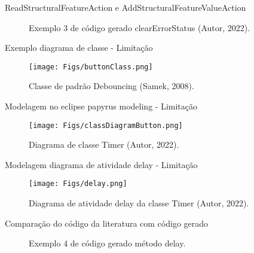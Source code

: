 \documentclass[handout,aspectratio = 169]{beamer}
\begin{document}
\begin{frame}{ReadStructuralFeatureAction e AddStructuralFeatureValueAction}

\begin{figure}[htbp]
\centering
{} %
\quad %
\caption{Exemplo 3 de código gerado clearErrorStatus (Autor, 2022).}
\end{figure}

\end{frame}

\begin{frame}{Exemplo diagrama de classe - Limitação}
    \begin{figure}
            \centering
             \texttt{[image: Figs/buttonClass.png]}
            \caption{Classe de padrão Debouncing (Samek, 2008).}
        \end{figure}
\end{frame}

\begin{frame}{Modelagem no eclipse papyrus modeling - Limitação}
    \begin{figure}
            \centering
             \texttt{[image: Figs/classDiagramButton.png]}
            \caption{Diagrama de classe Timer (Autor, 2022).}
        \end{figure}
\end{frame}

\begin{frame}{Modelagem diagrama de atividade delay - Limitação}
    \begin{figure}
            \centering
             \texttt{[image: Figs/delay.png]}
            \caption{Diagrama de atividade delay da classe Timer (Autor, 2022).}
        \end{figure}
\end{frame}

\begin{frame}{Comparação do código da literatura com código gerado}

\begin{figure}[htbp]
\centering
{} %
\quad %
\caption{Exemplo 4 de código gerado método delay.}
\end{figure}

\end{frame}
\end{document}

